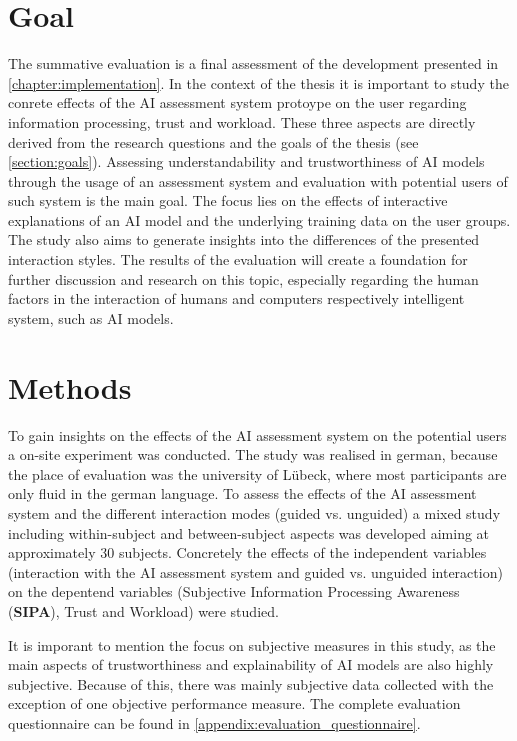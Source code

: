 \documentclass[11pt,a4paper,english]{scrreprt}
\begin{document}
\section{Goal}
The summative evaluation is a final assessment of the development presented in \autoref{chapter:implementation}. In the context of the thesis it is important to study the conrete effects of the AI assessment system protoype on the user regarding information processing, trust and workload. These three aspects are directly derived from the research questions and the goals of the thesis (see \autoref{section:goals}). Assessing understandability and trustworthiness of AI models through the usage of an assessment system and evaluation with potential users of such system is the main goal. The focus lies on the effects of interactive explanations of an AI model and the underlying training data on the user groups. The study also aims to generate insights into the differences of the presented interaction styles. The results of the evaluation will create a foundation for further discussion and research on this topic, especially regarding the human factors in the interaction of humans and computers respectively intelligent system, such as AI models.

\section{Methods}
To gain insights on the effects of the AI assessment system on the potential users a on-site experiment was conducted. The study was realised in german, because the place of evaluation was the university of Lübeck, where most participants are only fluid in the german language. To assess the effects of the AI assessment system and the different interaction modes (guided vs. unguided) a mixed study including within-subject and between-subject aspects was developed aiming at approximately 30 subjects. Concretely the effects of the independent variables (interaction with the AI assessment system and guided vs. unguided interaction) on the depentend variables (Subjective Information Processing Awareness (\textbf{SIPA}), Trust and Workload) were studied.

It is imporant to mention the focus on subjective measures in this study, as the main aspects of trustworthiness and explainability of AI models are also highly subjective. Because of this, there was mainly subjective data collected with the exception of one objective performance measure. The complete evaluation questionnaire can be found in \autoref{appendix:evaluation_questionnaire}.
\end{document}
